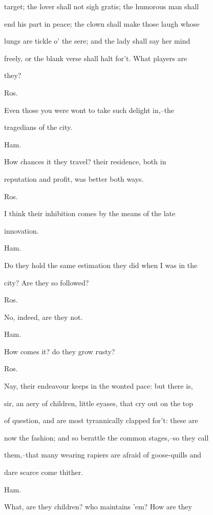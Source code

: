 \documentclass[12pt]{book}
\begin{document}
target; the lover shall not sigh gratis; the humorous man shall

end his part in peace; the clown shall make those laugh whose

lungs are tickle o' the sere; and the lady shall say her mind

freely, or the blank verse shall halt for't. What players are

they?



Ros.

Even those you were wont to take such delight in,--the

tragedians of the city.



Ham.

How chances it they travel? their residence, both in

reputation and profit, was better both ways.



Ros.

I think their inhibition comes by the means of the late

innovation.



Ham.

Do they hold the same estimation they did when I was in the

city? Are they so followed?



Ros.

No, indeed, are they not.



Ham.

How comes it? do they grow rusty?



Ros.

Nay, their endeavour keeps in the wonted pace: but there is,

sir, an aery of children, little eyases, that cry out on the top

of question, and are most tyrannically clapped for't: these are

now the fashion; and so berattle the common stages,--so they call

them,--that many wearing rapiers are afraid of goose-quills and

dare scarce come thither.



Ham.

What, are they children? who maintains 'em? How are they
\end{document}
